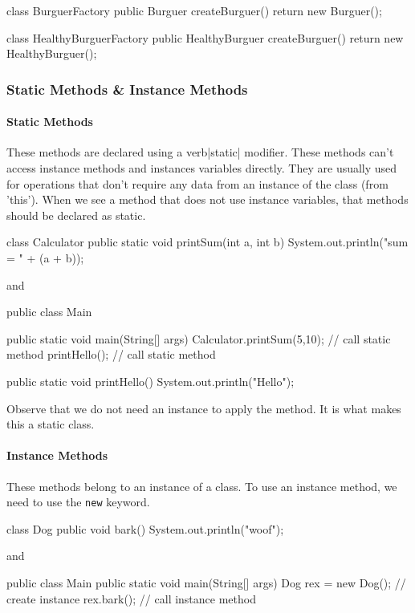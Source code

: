 \begin{listing}{1}
class BurguerFactory {
    public Burguer createBurguer() {
        return new Burguer();
    }
}

class HealthyBurguerFactory {
    public HealthyBurguer createBurguer() {
        return new HealthyBurguer();
    }
}
\end{listing}


\subsubsection{Static Methods \& Instance Methods}

\paragraph{Static Methods} These methods are declared using a verb|static| modifier. These 
methods can't access instance methods and instances variables directly. They are
usually used for operations that don't require any data from an instance of the 
class (from 'this'). When we see a method that does not use instance variables, that
methods should be declared as static. 
\begin{listing}{1}
class Calculator {
    public static void printSum(int a, int b) {
        System.out.println("sum = " + (a + b));
    }
}
\end{listing}
and
\begin{listing}{1}
public class Main {
    public static void main(String[] args) {
        Calculator.printSum(5,10); // call static method 
        printHello(); // call static method 
    }

    public static void printHello() {
        System.out.println("Hello");
    }
}
\end{listing}
Observe that we do not need an instance to apply the method. It is what makes this
a static class.

\paragraph{Instance Methods} These methods belong to an instance of a class. To use 
an instance method, we need to use the \verb|new| keyword.
\begin{listing}{1}
class Dog {
    public void bark() {
        System.out.println("woof");
    }
}
\end{listing}
and
\begin{listing}{1}
public class Main {
    public static void main(String[] args) {
        Dog rex = new Dog(); // create instance
        rex.bark(); // call instance method 
    }
}
\end{listing}

